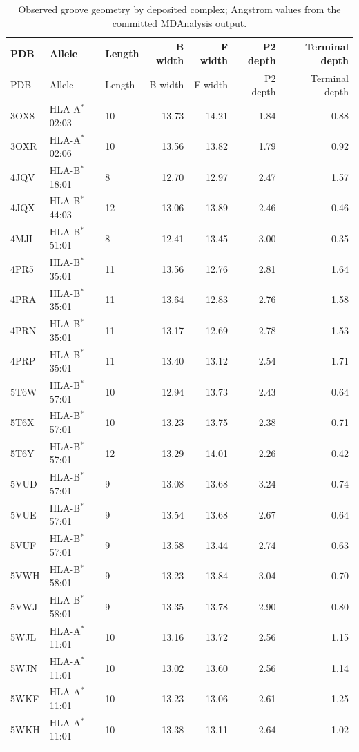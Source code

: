 \begin{longtable}{lllrrrr}
\caption{Observed groove geometry by deposited complex; Angstrom values from the committed MDAnalysis output.}\\
\hline PDB & Allele & Length & B width & F width & P2 depth & Terminal depth\\\hline\endfirsthead
\hline PDB & Allele & Length & B width & F width & P2 depth & Terminal depth\\\hline\endhead
3OX8 & HLA-A$^{*}$02:03 & 10 & 13.73 & 14.21 & 1.84 & 0.88\\
3OXR & HLA-A$^{*}$02:06 & 10 & 13.56 & 13.82 & 1.79 & 0.92\\
4JQV & HLA-B$^{*}$18:01 & 8 & 12.70 & 12.97 & 2.47 & 1.57\\
4JQX & HLA-B$^{*}$44:03 & 12 & 13.06 & 13.89 & 2.46 & 0.46\\
4MJI & HLA-B$^{*}$51:01 & 8 & 12.41 & 13.45 & 3.00 & 0.35\\
4PR5 & HLA-B$^{*}$35:01 & 11 & 13.56 & 12.76 & 2.81 & 1.64\\
4PRA & HLA-B$^{*}$35:01 & 11 & 13.64 & 12.83 & 2.76 & 1.58\\
4PRN & HLA-B$^{*}$35:01 & 11 & 13.17 & 12.69 & 2.78 & 1.53\\
4PRP & HLA-B$^{*}$35:01 & 11 & 13.40 & 13.12 & 2.54 & 1.71\\
5T6W & HLA-B$^{*}$57:01 & 10 & 12.94 & 13.73 & 2.43 & 0.64\\
5T6X & HLA-B$^{*}$57:01 & 10 & 13.23 & 13.75 & 2.38 & 0.71\\
5T6Y & HLA-B$^{*}$57:01 & 12 & 13.29 & 14.01 & 2.26 & 0.42\\
5VUD & HLA-B$^{*}$57:01 & 9 & 13.08 & 13.68 & 3.24 & 0.74\\
5VUE & HLA-B$^{*}$57:01 & 9 & 13.54 & 13.68 & 2.67 & 0.64\\
5VUF & HLA-B$^{*}$57:01 & 9 & 13.58 & 13.44 & 2.74 & 0.63\\
5VWH & HLA-B$^{*}$58:01 & 9 & 13.23 & 13.84 & 3.04 & 0.70\\
5VWJ & HLA-B$^{*}$58:01 & 9 & 13.35 & 13.78 & 2.90 & 0.80\\
5WJL & HLA-A$^{*}$11:01 & 10 & 13.16 & 13.72 & 2.56 & 1.15\\
5WJN & HLA-A$^{*}$11:01 & 10 & 13.02 & 13.60 & 2.56 & 1.14\\
5WKF & HLA-A$^{*}$11:01 & 10 & 13.23 & 13.06 & 2.61 & 1.25\\
5WKH & HLA-A$^{*}$11:01 & 10 & 13.38 & 13.11 & 2.64 & 1.02\\

\end{longtable}
